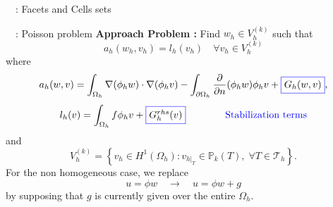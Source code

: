 \begin{frame}{\appendixname~\theappendixframenumber~: Facets and Cells sets}
\end{frame}

\begin{frame}{\appendixname~\theappendixframenumber~: Poisson problem}
	\textbf{Approach Problem :} Find $w_h\in V_h^{(k)}$ such that 
	$$a_h(w_h,v_h) = l_h(v_h) \quad \forall v_h \in V_h^{(k)}$$
	where
	$$a_h(w,v)=\int_{\Omega_h} \nabla (\phi_h w) \cdot \nabla (\phi_h v) - \int_{\partial\Omega_h} \frac{\partial}{\partial n}(\phi_h w)\phi_h v+\fcolorbox{blue}{white}{$G_h(w,v)$},$$
	$$l_h(v)=\int_{\Omega_h} f \phi_h v + \fcolorbox{blue}{white}{$G_h^{rhs}(v)$} \qquad \qquad \color{blue}\text{Stabilization terms}$$
	and 
	$$V_h^{(k)}=\left\{v_h\in H^1(\Omega_h):v_{h|_T}\in\mathbb{P}_k(T), \; \forall T\in\mathcal{T}_h\right\}.$$
	For the non homogeneous case, we replace
	$$u=\phi w \quad \rightarrow \quad u=\phi w+g$$ 
	by supposing that $g$ is currently given over the entire $\Omega_h$.
\end{frame}

